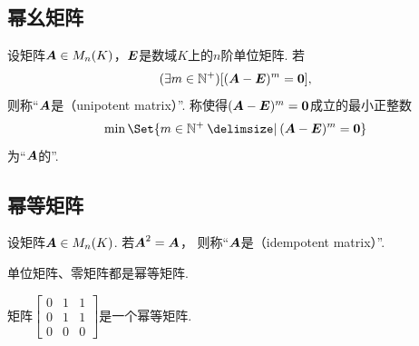 \subsection{幂幺矩阵}
\begin{definition}
设矩阵\(\boldsymbol{A} \in M_n(K)\)，\(\boldsymbol{E}\)是数域\(K\)上的\(n\)阶单位矩阵.
若\begin{equation*}
	(\exists m\in\mathbb{N}^+)
	[(\boldsymbol{A}-\boldsymbol{E})^m=\boldsymbol0],
\end{equation*}
则称“\(\boldsymbol{A}\)是（unipotent matrix）”.
称使得\((\boldsymbol{A}-\boldsymbol{E})^m=\boldsymbol0\)成立的最小正整数\begin{equation*}
    \min\Set{ m\in\mathbb{N}^+ \given (\vb{A}-\vb{E})^m=\vb0 }
\end{equation*}为“\(\boldsymbol{A}\)的”.
\end{definition}

\subsection{幂等矩阵}
\begin{definition}\label{definition:幂等矩阵.幂等矩阵的定义}
设矩阵\(\boldsymbol{A} \in M_n(K)\).
若\(\boldsymbol{A}^2 = \boldsymbol{A}\)，
则称“\(\boldsymbol{A}\)是（idempotent matrix）”.
\end{definition}

\begin{example}
单位矩阵、零矩阵都是幂等矩阵.
\end{example}

\begin{example}
矩阵\(
	\begin{bmatrix}
		0 & 1 & 1 \\
		0 & 1 & 1 \\
		0 & 0 & 0
	\end{bmatrix}
\)是一个幂等矩阵.
\end{example}

